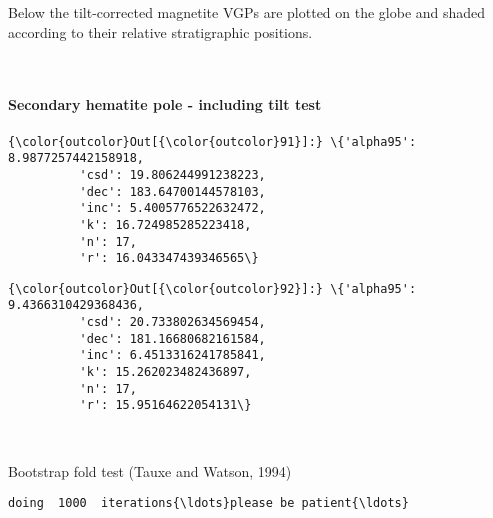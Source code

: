\documentclass[11pt]{article}
\begin{document}
    Below the tilt-corrected magnetite VGPs are plotted on the globe and
shaded according to their relative stratigraphic positions.


    \begin{center}
    \end{center}
    { \hspace*{\fill} \\}
    
    \paragraph{Secondary hematite pole - including tilt
test}\label{secondary-hematite-pole---including-tilt-test}




            \begin{Verbatim}[commandchars=\\\{\}]
{\color{outcolor}Out[{\color{outcolor}91}]:} \{'alpha95': 8.9877257442158918,
          'csd': 19.806244991238223,
          'dec': 183.64700144578103,
          'inc': 5.4005776522632472,
          'k': 16.724985285223418,
          'n': 17,
          'r': 16.043347439346565\}
\end{Verbatim}
        

            \begin{Verbatim}[commandchars=\\\{\}]
{\color{outcolor}Out[{\color{outcolor}92}]:} \{'alpha95': 9.4366310429368436,
          'csd': 20.733802634569454,
          'dec': 181.16680682161584,
          'inc': 6.4513316241785841,
          'k': 15.262023482436897,
          'n': 17,
          'r': 15.95164622054131\}
\end{Verbatim}
        

    \begin{center}
    \end{center}
    { \hspace*{\fill} \\}
    
    Bootstrap fold test (Tauxe and Watson, 1994)


    \begin{Verbatim}[commandchars=\\\{\}]
doing  1000  iterations{\ldots}please be patient{\ldots}

    \end{Verbatim}
\end{document}
